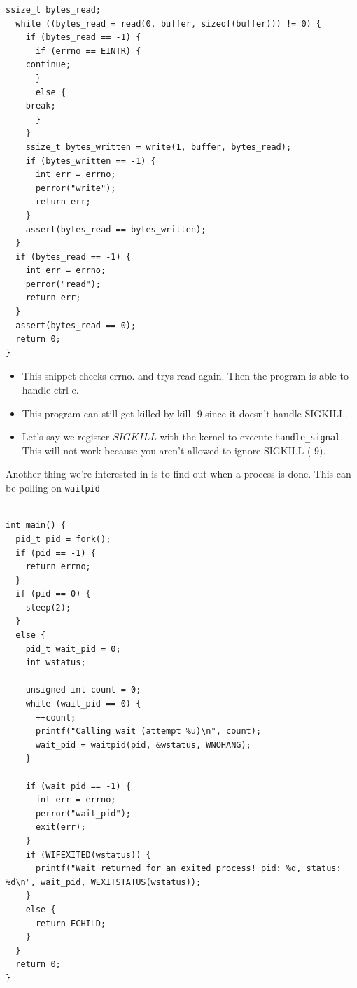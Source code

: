 \documentclass[../notes.tex]{subfiles}
\begin{document}
\begin{listing}[H]
\begin{verbatim}
ssize_t bytes_read;
  while ((bytes_read = read(0, buffer, sizeof(buffer))) != 0) {
    if (bytes_read == -1) {
      if (errno == EINTR) {
	continue;
      }
      else {
	break;
      }
    }
    ssize_t bytes_written = write(1, buffer, bytes_read);
    if (bytes_written == -1) {
      int err = errno;
      perror("write");
      return err;
    }
    assert(bytes_read == bytes_written);
  }
  if (bytes_read == -1) {
    int err = errno;
    perror("read");
    return err;
  }
  assert(bytes_read == 0);
  return 0;
}
\end{verbatim}
\end{listing}

\begin{itemize}
    \item This snippet checks errno. and trys read again. Then the program is able to handle ctrl-c.
    \item This program can still get killed by kill -9 since it doesn't handle SIGKILL.
    \item Let's say we register $ SIGKILL $ with the kernel to execute \texttt{handle\_signal}. This will not work because you aren't allowed to ignore SIGKILL (-9).
\end{itemize}


Another thing we're interested in is to find out when a process is done. This can be polling on \texttt{waitpid}

\begin{listing}[H]
\begin{verbatim}

int main() {
  pid_t pid = fork();
  if (pid == -1) {
    return errno;
  }
  if (pid == 0) {
    sleep(2);
  }
  else {
    pid_t wait_pid = 0;
    int wstatus;

    unsigned int count = 0;
    while (wait_pid == 0) {
      ++count;
      printf("Calling wait (attempt %u)\n", count);
      wait_pid = waitpid(pid, &wstatus, WNOHANG);
    }

    if (wait_pid == -1) {
      int err = errno;
      perror("wait_pid");
      exit(err);
    }
    if (WIFEXITED(wstatus)) {
      printf("Wait returned for an exited process! pid: %d, status: %d\n", wait_pid, WEXITSTATUS(wstatus));
    }
    else {
      return ECHILD;
    }
  }
  return 0;
}
\end{verbatim}
\end{listing}
\end{document}
